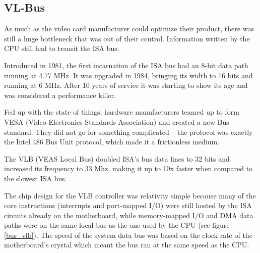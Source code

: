 \subsection{VL-Bus}
As much as the video card manufacturer could optimize their product, there was still a huge bottleneck that was out of their control. Information written by the CPU still had to transit the ISA bus.\\
\par
 Introduced in 1981, the first incarnation of the ISA bus had an 8-bit data path running at 4.77 MHz. It was upgraded in 1984, bringing its width to 16 bits and running at 6 MHz. After 10 years of service it was starting to show its age and was considered a performance killer.\\
\par
{}
\par
Fed up with the state of things, hardware manufacturers teamed up to form VESA (Video Electronics Standards Association) and created a new Bus standard. They did not go for something complicated -- the protocol was exactly the Intel 486 Bus Unit protocol, which made it a frictionless medium.\\
\par 
The VLB (VEAS Local Bus) doubled ISA's bus data lines to 32 bits and increased its frequency to 33 Mhz, making it up to 10x faster when compared to the slowest ISA bus.\\
\par
The chip design for the VLB controller was relativity simple because many of the core instructions (interrupts and port-mapped I/O) were still hosted by the ISA circuits already on the motherboard, while memory-mapped I/O and DMA data paths were on the same local bus as the one used by the CPU (see figure \ref{bus_vlb}). The speed of the system data bus was based on the clock rate of the motherboard's crystal which meant the bus ran at the same speed as the CPU.\\
\par
{}
\label{vlbarchitecture}

